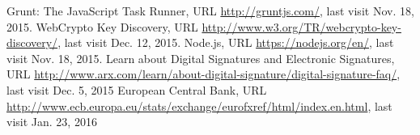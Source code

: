 \begin{thebibliography}{99}
 Grunt: The JavaScript Task Runner, URL \url{http://gruntjs.com/}, last visit Nov. 18, 2015.
 WebCrypto Key Discovery, \newline URL \url{http://www.w3.org/TR/webcrypto-key-discovery/}, last visit Dec. 12, 2015.
 Node.js, URL \url{https://nodejs.org/en/}, last visit Nov. 18, 2015.
 Learn about Digital Signatures and Electronic Signatures, URL \url{http://www.arx.com/learn/about-digital-signature/digital-signature-faq/}, last visit Dec. 5, 2015
 European Central Bank, URL
\url{http://www.ecb.europa.eu/stats/exchange/eurofxref/html/index.en.html}, last visit Jan. 23, 2016




\end{thebibliography}
